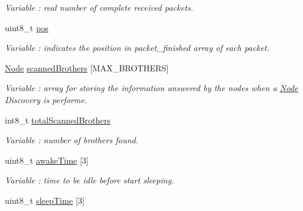 \begin{DoxyCompactItemize}
\begin{DoxyCompactList}\small\item\em Variable \+: real number of complete received packets. \end{DoxyCompactList}\item 
uint8\+\_\+t \hyperlink{class_wasp_x_bee_core_a14c1b2fcd2b6a0bd99dae8e287bf40e0}{pos}\hypertarget{class_wasp_x_bee_core_a14c1b2fcd2b6a0bd99dae8e287bf40e0}{}\label{class_wasp_x_bee_core_a14c1b2fcd2b6a0bd99dae8e287bf40e0}

\begin{DoxyCompactList}\small\item\em Variable \+: indicates the position in \textquotesingle{}packet\+\_\+finished\textquotesingle{} array of each packet. \end{DoxyCompactList}\item 
\hyperlink{struct_node}{Node} \hyperlink{class_wasp_x_bee_core_a5f406da3e2ec38bf528a4df51ae4d773}{scanned\+Brothers} \mbox{[}M\+A\+X\+\_\+\+B\+R\+O\+T\+H\+E\+RS\mbox{]}\hypertarget{class_wasp_x_bee_core_a5f406da3e2ec38bf528a4df51ae4d773}{}\label{class_wasp_x_bee_core_a5f406da3e2ec38bf528a4df51ae4d773}

\begin{DoxyCompactList}\small\item\em Variable \+: array for storing the information answered by the nodes when a \hyperlink{struct_node}{Node} Discovery is performe. \end{DoxyCompactList}\item 
int8\+\_\+t \hyperlink{class_wasp_x_bee_core_a3d85e2d1bf37566aa9ac3dafc2d6dad9}{total\+Scanned\+Brothers}\hypertarget{class_wasp_x_bee_core_a3d85e2d1bf37566aa9ac3dafc2d6dad9}{}\label{class_wasp_x_bee_core_a3d85e2d1bf37566aa9ac3dafc2d6dad9}

\begin{DoxyCompactList}\small\item\em Variable \+: number of brothers found. \end{DoxyCompactList}\item 
uint8\+\_\+t \hyperlink{class_wasp_x_bee_core_acdf0c5e6cfc04aebdecfe67b715d7ad2}{awake\+Time} \mbox{[}3\mbox{]}\hypertarget{class_wasp_x_bee_core_acdf0c5e6cfc04aebdecfe67b715d7ad2}{}\label{class_wasp_x_bee_core_acdf0c5e6cfc04aebdecfe67b715d7ad2}

\begin{DoxyCompactList}\small\item\em Variable \+: time to be idle before start sleeping. \end{DoxyCompactList}\item 
uint8\+\_\+t \hyperlink{class_wasp_x_bee_core_a71afbca4f5e9c58104bab19e781999dc}{sleep\+Time} \mbox{[}3\mbox{]}\hypertarget{class_wasp_x_bee_core_a71afbca4f5e9c58104bab19e781999dc}{}\label{class_wasp_x_bee_core_a71afbca4f5e9c58104bab19e781999dc}


\end{DoxyCompactItemize}

